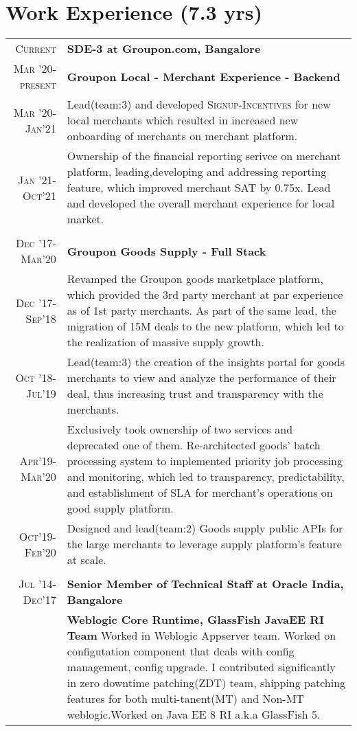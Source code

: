 \documentclass[a4paper,10pt]{article}
\begin{document}
\section{Work Experience \normalsize(7.3 yrs)}
\begin{tabular}{rp{15cm}}
 \textsc{Current} & \textbf{SDE-3 at Groupon.com, Bangalore} \\
 \textsc{Mar '20-present}&\textbf{Groupon Local - Merchant Experience - Backend}\\ \small \textsc{ Mar '20-Jan'21}&\normalsize{Lead(team:3) and developed \textsc{Signup-Incentives} for new local merchants which resulted in increased new onboarding of merchants on merchant platform.}\\ \small \textsc{ Jan '21-Oct'21}&\normalsize{Ownership of the financial reporting serivce on merchant platform, leading,developing and addressing reporting feature, which improved merchant SAT by 0.75x. Lead and developed the overall merchant experience for local market.}\\ 
   \multicolumn{2}{c}{} \\
 \textsc{Dec '17-Mar'20}& \textbf{Groupon Goods Supply - Full Stack} \\ \small \textsc{Dec '17-Sep'18}&\normalsize{Revamped the Groupon goods marketplace platform, which provided the 3rd party merchant at par experience as of 1st party merchants. As part of the same lead, the migration of 15M deals to the new platform, which led to the realization of massive supply growth.} \\ \small \textsc{Oct '18-Jul'19}&\normalsize{Lead(team:3) the creation of the insights portal for goods merchants to view and analyze the performance of their deal, thus increasing trust and transparency with the merchants.} \\ \small \textsc{Apr'19-Mar'20}&\normalsize{Exclusively took ownership of two services and deprecated one of them. Re-architected goods' batch processing system to implemented priority job processing and monitoring, which led to transparency, predictability, and establishment of SLA for merchant's operations on good supply platform.}\\ \small \textsc{Oct'19-Feb'20}&\normalsize{Designed and lead(team:2) Goods supply public APIs for the large merchants to leverage supply platform's feature at scale.} \\
  \multicolumn{2}{c}{} \\
 \textsc{Jul '14-Dec'17}& \textbf{Senior Member of Technical Staff at Oracle India, Bangalore}\\
 &\textbf{Weblogic Core Runtime, GlassFish JavaEE RI Team} \normalsize{Worked in Weblogic Appserver team. Worked on configutation component that deals with config management, config upgrade. I contributed significantly in zero downtime patching(ZDT) team, shipping patching features for both multi-tanent(MT) and Non-MT weblogic.Worked on Java EE 8 RI a.k.a GlassFish 5.}
\end{tabular}
\end{document}
